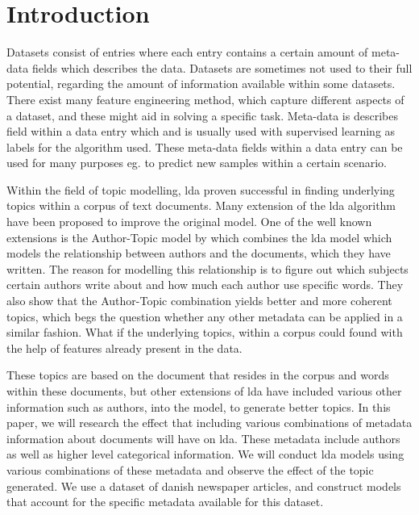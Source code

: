 \section{Introduction}\label{sec:introduction}
Datasets consist of entries where each entry contains a certain amount of meta-data fields which describes the data.
Datasets are sometimes not used to their full potential, regarding the amount of information available within some datasets.
There exist many feature engineering method, which capture different aspects of a dataset, and these might aid in solving a specific task.
Meta-data is describes field within a data entry which and is usually used with supervised learning as labels for the algorithm used.
These meta-data fields within a data entry can be used for many purposes eg. to predict new samples within a certain scenario.

Within the field of topic modelling, \Gls{lda} proven successful in finding underlying topics within a corpus of text documents.
Many extension of the \gls{lda} algorithm have been proposed to improve the original model.
One of the well known extensions is the Author-Topic model by \citet{author_topic} which combines the \gls{lda} model which models the relationship between authors and the documents, which they have written.
The reason for modelling this relationship is to figure out which subjects certain authors write about and how much each author use specific words. 
They also show that the Author-Topic combination yields better and more coherent topics, which begs the question whether any other metadata can be applied in a similar fashion.
What if the underlying topics, within a corpus could found with the help of features already present in the data.

These topics are based on the document that resides in the corpus and words within these documents, but other extensions of \gls{lda} have included various other information such as authors, into the model, to generate better topics.
In this paper, we will research the effect that including various combinations of metadata information about documents will have on \gls{lda}.
These metadata include authors as well as higher level categorical information.
We will conduct \gls{lda} models using various combinations of these metadata and observe the effect of the topic generated.
We use a dataset of danish newspaper articles, and construct models that account for the specific metadata available for this dataset.
